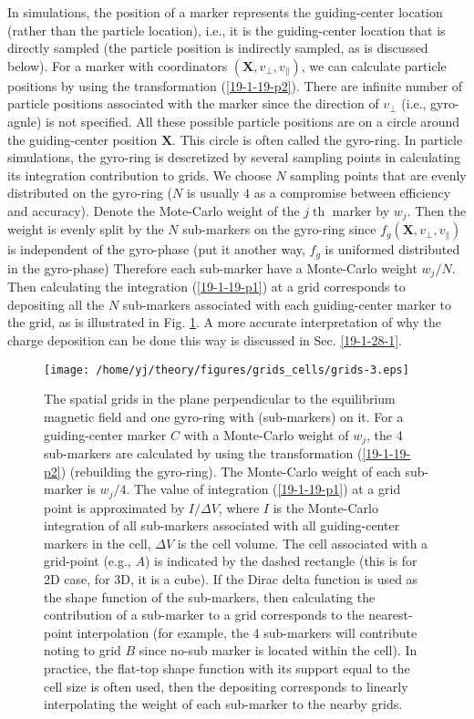 \documentclass{article}
\newcommand{\tmcolor}[2]{{\color{#1}{#2}}}
\newcommand{\tmop}[1]{\ensuremath{\operatorname{#1}}}
\begin{document}
In simulations, the position of a marker represents the guiding-center
location (rather than the particle location), i.e., it is the guiding-center
location that is directly sampled (the particle position is indirectly
sampled, as is discussed below). For a marker with coordinators $(\mathbf{X},
v_{\perp}, v_{\parallel})$, we can calculate particle positions by using the
transformation (\ref{19-1-19-p2}). There are infinite number of particle
positions associated with the marker since the direction of $v_{\perp}$ (i.e.,
gyro-agnle) is not specified. All these possible particle positions are on a
circle around the guiding-center position $\mathbf{X}$. This circle is often
called the gyro-ring. In particle simulations, the gyro-ring is descretized by
several sampling points in calculating its integration contribution to grids.
We choose $N$ sampling points that are evenly distributed on the gyro-ring
($N$ is usually $4$ as a compromise between efficiency and accuracy). Denote
the Mote-Carlo weight of the $j \tmop{th}$ marker by $w_j$. Then the weight is
evenly split by the $N$ sub-markers on the gyro-ring since $f_g (\mathbf{X},
v_{\perp}, v_{\parallel})$ is independent of the gyro-phase (put it another
way, $f_g$ is uniformed distributed in the gyro-phase) Therefore each
sub-marker have a Monte-Carlo weight $w_j / N$. Then calculating the
integration (\ref{19-1-19-p1}) at a grid corresponds to depositing all the $N$
sub-markers associated with each guiding-center marker to the grid, as is
illustrated in Fig. \ref{19-1-19-p4}. A more accurate interpretation of why
the charge deposition can be done this way is discussed in Sec.
\ref{19-1-28-1}.

\begin{figure}[h]
  \texttt{[image: /home/yj/theory/figures/grids\_cells/grids-3.eps]}
  \caption{\label{19-1-19-p4}The spatial grids in the plane perpendicular to
  the equilibrium magnetic field and one gyro-ring with \tmcolor{blue}{4
  sampling points} (sub-markers) on it. For a guiding-center marker $C$ with a
  Monte-Carlo weight of $w_j$, the 4 sub-markers are calculated by using the
  transformation (\ref{19-1-19-p2}) (rebuilding the gyro-ring). The
  Monte-Carlo weight of each sub-marker is $w_j / 4$. The value of integration
  (\ref{19-1-19-p1}) at a grid point is approximated by $I / \Delta V$, where
  $I$ is the Monte-Carlo integration of all sub-markers associated with all
  guiding-center markers in the cell, $\Delta V$ is the cell volume. The cell
  associated with a grid-point (e.g., $A$) is indicated by the dashed
  rectangle (this is for 2D case, for 3D, it is a cube). If the Dirac delta
  function is used as the shape function of the sub-markers, then calculating
  the contribution of a sub-marker to a grid corresponds to the nearest-point
  interpolation (for example, the 4 sub-markers will contribute noting to grid
  $B$ since no-sub marker is located within the cell). In practice, the
  flat-top shape function with its support equal to the cell size is often
  used, then the depositing corresponds to linearly interpolating the weight
  of each sub-marker to the nearby grids.}
\end{figure}
\end{document}

